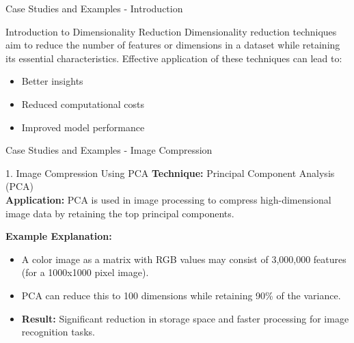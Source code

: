 \documentclass[aspectratio=169]{beamer}
\begin{document}
\begin{frame}[fragile]{Case Studies and Examples - Introduction}
  \begin{block}{Introduction to Dimensionality Reduction}
    Dimensionality reduction techniques aim to reduce the number of features or dimensions in a dataset while retaining its essential characteristics. Effective application of these techniques can lead to:
    \begin{itemize}
      \item Better insights
      \item Reduced computational costs
      \item Improved model performance
    \end{itemize}
  \end{block}
\end{frame}

\begin{frame}[fragile]{Case Studies and Examples - Image Compression}
  \begin{block}{1. Image Compression Using PCA}
    \textbf{Technique:} Principal Component Analysis (PCA) \\
    \textbf{Application:} PCA is used in image processing to compress high-dimensional image data by retaining the top principal components.
    
    \textbf{Example Explanation:}
    \begin{itemize}
      \item A color image as a matrix with RGB values may consist of 3,000,000 features (for a 1000x1000 pixel image).
      \item PCA can reduce this to 100 dimensions while retaining 90\% of the variance.
      \item \textbf{Result:} Significant reduction in storage space and faster processing for image recognition tasks.
    \end{itemize}
  \end{block}
\end{frame}
\end{document}
